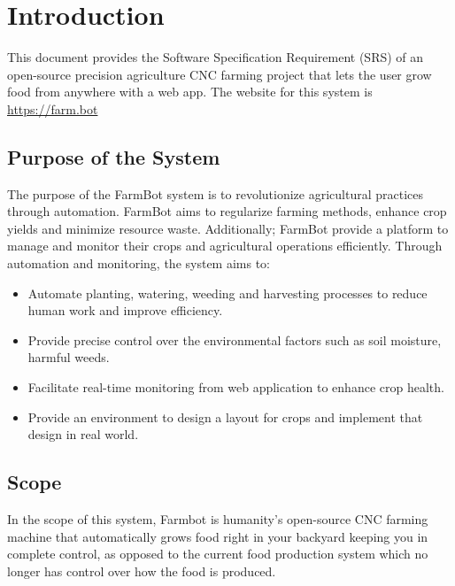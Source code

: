 
\chapter{Introduction} \label{introduction}

This document provides the Software Specification Requirement (SRS) of an open-source precision agriculture CNC farming project that lets the user grow food from anywhere with a web app. The website for this system is \url{https://farm.bot}

\section{Purpose of the System }

The purpose of the FarmBot system is to revolutionize agricultural practices through automation. FarmBot aims to regularize farming methods, enhance crop yields and minimize resource waste. Additionally; FarmBot provide a platform to manage and monitor their crops and agricultural operations efficiently. Through automation and monitoring, the system aims to:

\begin{itemize}
    \item Automate planting, watering, weeding and harvesting processes to reduce human work and improve efficiency.
    \item Provide precise control over the environmental factors such as soil moisture, harmful weeds.
    \item Facilitate real-time monitoring from web application to enhance crop health.
    \item Provide an environment to design a layout for crops and implement that design in real world.
\end{itemize}

\section{Scope}

In the scope of this system, Farmbot is humanity's open-source CNC farming machine that automatically grows food right in your backyard keeping you in complete control, as opposed to the current food production system which no longer has control over how the food is produced. 

